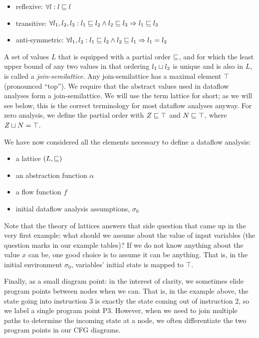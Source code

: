\documentclass[11pt]{article}
\begin{document}
\begin{itemize}[labelwidth=0.7em, labelsep=0.6em, topsep=0ex, itemsep=0ex,
  parsep=0ex]
\item reflexive: $\forall l : l \sqsubseteq l$
\item transitive: $\forall l_1, l_2, l_3 : l_1 \sqsubseteq l_2 \land l_2 \sqsubseteq l_3 \Rightarrow l_1 \sqsubseteq l_3$
\item anti-symmetric: $\forall l_1, l_2 : l_1 \sqsubseteq l_2 \land l_2 \sqsubseteq l_1 \Rightarrow l_1 = l_2$
\end{itemize}

A set of values $L$ that is equipped with a partial order $\sqsubseteq$, and for which
the least upper bound of any two values in that ordering $l_1 \sqcup l_2$ is
unique and is also in $L$, is called a \textit{join-semilattice}.  Any
join-semilattice has a maximal element $\top$ (pronounced ``top'').  We require
that the abstract values used in dataflow analyses form a join-semilattice.  We
will use the term lattice for short; as we will see below, this is the correct
terminology for most dataflow analyses anyway.
%
For zero analysis, we define the partial order with $Z \sqsubseteq \top$ and $N \sqsubseteq
\top $, where $Z \sqcup N = \top$.


We have now considered all the elements necessary to define a
dataflow analysis:

\begin{itemize}[labelwidth=0.7em, labelsep=0.6em, topsep=0ex, itemsep=0ex,
  parsep=0ex]
\item a lattice $(L,\sqsubseteq)$
\item an abstraction function $\alpha$
\item a flow function $f$
\item initial dataflow analysis assumptions, $\sigma_0$
\end{itemize}

Note that the theory of lattices answers that side question that came up in the
very first example: what should we assume
about the value of input variables (the question marks in our example tables)? 
If we do not know anything about the value $x$ can be,
one good choice is to assume it can be anything. That is, in the initial
environment $\sigma_0$, variables' initial state is mapped to $\top$.  

Finally, as a small diagram point: in the interest of clarity, we sometimes
elide program points between nodes when we can. That is, in the example above,
the state going into instruction 3 is exactly the state coming out of
instruction 2, so we label a single program point P3.  However, when we need to
join multiple paths to determine the incoming state at a node, we often
differentiate the two program points in our CFG diagrams. 
\end{document}
